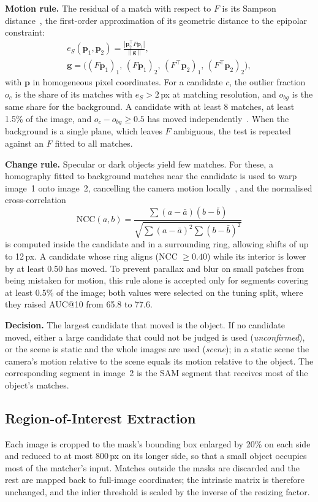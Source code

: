 \documentclass[10pt,a4paper,twocolumn]{article}
\begin{document}
\textbf{Motion rule.} The residual of a match with respect to $F$ is its Sampson distance~\cite{hz}, the first-order approximation of its geometric distance to the epipolar constraint:
\begin{gather}
  e_S(\mathbf{p}_1,\mathbf{p}_2)=\frac{|\mathbf{p}_2^\top F\mathbf{p}_1|}{\|\mathbf{g}\|},\label{eq:sampson}\\
  \mathbf{g}=\big((F\mathbf{p}_1)_1,\,(F\mathbf{p}_1)_2,\,(F^\top\mathbf{p}_2)_1,\,(F^\top\mathbf{p}_2)_2\big),\nonumber
\end{gather}
with $\mathbf{p}$ in homogeneous pixel coordinates. For a candidate $c$, the outlier fraction $o_c$ is the share of its matches with $e_S>2$\,px at matching resolution, and $o_{bg}$ is the same share for the background. A candidate with at least 8 matches, at least 1.5\% of the image, and $o_c-o_{bg}\ge 0.5$ has moved independently~\cite{torr}. When the background is a single plane, which leaves $F$ ambiguous, the test is repeated against an $F$ fitted to all matches.

\textbf{Change rule.} Specular or dark objects yield few matches. For these, a homography fitted to background matches near the candidate is used to warp image~1 onto image~2, cancelling the camera motion locally~\cite{irani}, and the normalised cross-correlation~\cite{lewis}
\begin{equation}
  \mathrm{NCC}(a,b) = \frac{\sum (a-\bar a)(b-\bar b)}{\sqrt{\sum (a-\bar a)^2\sum (b-\bar b)^2}}
\end{equation}
is computed inside the candidate and in a surrounding ring, allowing shifts of up to 12\,px. A candidate whose ring aligns (NCC $\ge 0.40$) while its interior is lower by at least 0.50 has moved. To prevent parallax and blur on small patches from being mistaken for motion, this rule alone is accepted only for segments covering at least 0.5\% of the image; both values were selected on the tuning split, where they raised AUC@10 from 65.8 to 77.6.

\textbf{Decision.} The largest candidate that moved is the object. If no candidate moved, either a large candidate that could not be judged is used (\emph{unconfirmed}), or the scene is static and the whole images are used (\emph{scene}); in a static scene the camera's motion relative to the scene equals its motion relative to the object. The corresponding segment in image~2 is the SAM segment that receives most of the object's matches.

\subsection*{Region-of-Interest Extraction}
Each image is cropped to the mask's bounding box enlarged by 20\% on each side and reduced to at most 800\,px on its longer side, so that a small object occupies most of the matcher's input. Matches outside the masks are discarded and the rest are mapped back to full-image coordinates; the intrinsic matrix is therefore unchanged, and the inlier threshold is scaled by the inverse of the resizing factor.
\end{document}
